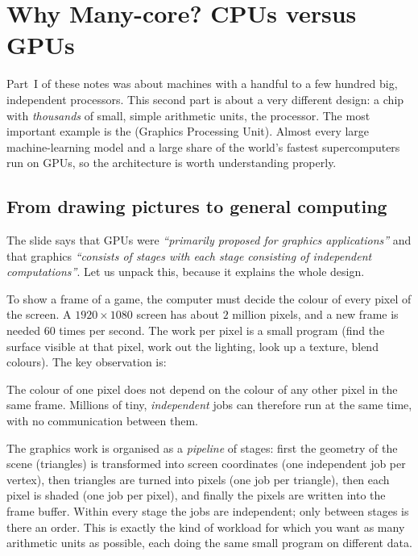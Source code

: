 \chapter{Why Many-core? CPUs versus GPUs}
\label{ch:manycore}


Part~I of these notes was about machines with a handful to a few hundred big, independent
processors. This second part is about a very different design: a chip with \emph{thousands} of
small, simple arithmetic units, the  processor. The most important example is the
 (Graphics Processing Unit). Almost every large machine-learning model and a large share of
the world's fastest supercomputers run on GPUs, so the architecture is worth understanding properly.

\section{From drawing pictures to general computing}

The slide says that GPUs were \emph{``primarily proposed for graphics applications''} and that
graphics \emph{``consists of stages with each stage consisting of independent computations''}.
Let us unpack this, because it explains the whole design.

To show a frame of a game, the computer must decide the colour of every pixel of the screen. A
$1920\times1080$ screen has about $2$ million pixels, and a new frame is needed $60$ times per second. The work per pixel is
a small program (find the surface visible at that pixel, work out the lighting, look up a texture,
blend colours). The key observation is:
\begin{keyidea}
The colour of one pixel does not depend on the colour of any other pixel in the same frame. Millions of
tiny, \emph{independent} jobs can therefore run at the same time, with no communication between them.
\end{keyidea}

The graphics work is organised as a \emph{pipeline} of stages: first the geometry of the scene
(triangles) is transformed into screen coordinates (one independent job per vertex), then triangles
are turned into pixels (one job per triangle), then each pixel is shaded (one job per pixel), and
finally the pixels are written into the frame buffer. Within every stage the jobs are independent;
only between stages is there an order. This is exactly the kind of workload for which you
want as many arithmetic units as possible, each doing the same small program on different data.

